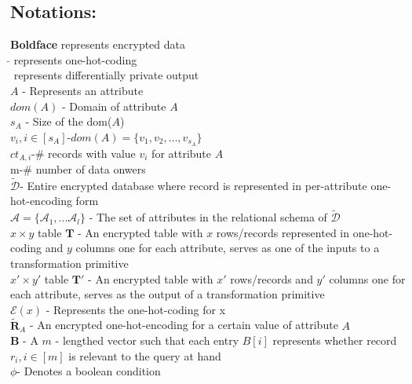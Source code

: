 \subsection{Notations:}\textbf{Boldface} represents encrypted data\\$\tilde{}$ represents one-hot-coding\\$\hat{}$ represents differentially private output\\ %
$A$ - Represents an attribute\\$dom(A)$ - Domain of attribute  $A$\\$s_A$ - Size of the dom($A$)\\$v_i, i \in [s_A]$-$dom(A)=\{v_1,v_2,\ldots, v_{s_A}\}$\\$ct_{A,i}$-\# records with value $v_i$ for attribute $A$\\m-\# number of data onwers\\$\boldsymbol{\tilde{\mathcal{D}}}$- Entire encrypted database where record is represented in per-attribute one-hot-encoding form\\ $\mathcal{A}=\{\mathcal{A}_1,...\mathcal{A}_l\}$ - The set of attributes in the relational schema of $\boldsymbol{\tilde{\mathcal{D}}}$\\
$x \times y$ table $\mathbf{T}$ - An encrypted table  with $x$ rows/records represented in one-hot-coding and $y$ columns one for each  attribute, serves as one of the inputs to a transformation primitive
\\
$x' \times y'$ table $\mathbf{T}'$ - An encrypted table  with $x'$ rows/records and $y'$ columns one for each  attribute, serves as the output of a transformation primitive\\
$\mathcal{E}(x)$ - Represents the one-hot-coding for x\\
$\tilde{\mathbf{R}}_{A}$ - An encrypted one-hot-encoding for a certain value of attribute $A$\\
$\mathbf{B}$ - A $m$ - lengthed vector such that each entry $B[i]$ represents whether record $r_i, i \in [m]$ is relevant to the query at hand 
\\$\phi$- Denotes a boolean condition
